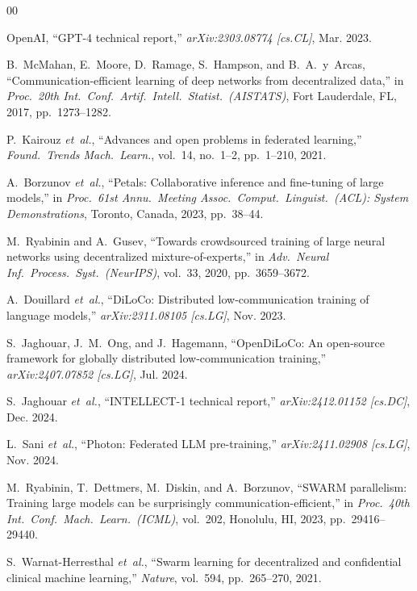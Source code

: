 \documentclass[conference]{IEEEtran}
\begin{document}
\balance
\begin{thebibliography}{00}

OpenAI, ``GPT-4 technical report,'' \emph{arXiv:2303.08774 [cs.CL]}, Mar. 2023.

B.~McMahan, E.~Moore, D.~Ramage, S.~Hampson, and B.~A.~y~Arcas, ``Communication-efficient learning of deep networks from decentralized data,'' in \emph{Proc.\ 20th Int.\ Conf.\ Artif.\ Intell.\ Statist.\ (AISTATS)}, Fort Lauderdale, FL, 2017, pp.~1273--1282.

P.~Kairouz \emph{et~al.}, ``Advances and open problems in federated learning,'' \emph{Found.\ Trends Mach.\ Learn.}, vol.~14, no.~1--2, pp.~1--210, 2021.

A.~Borzunov \emph{et~al.}, ``Petals: Collaborative inference and fine-tuning of large models,'' in \emph{Proc.\ 61st Annu.\ Meeting Assoc.\ Comput.\ Linguist.\ (ACL): System Demonstrations}, Toronto, Canada, 2023, pp.~38--44.

M.~Ryabinin and A.~Gusev, ``Towards crowdsourced training of large neural networks using decentralized mixture-of-experts,'' in \emph{Adv.\ Neural Inf.\ Process.\ Syst.\ (NeurIPS)}, vol.~33, 2020, pp.~3659--3672.

A.~Douillard \emph{et~al.}, ``DiLoCo: Distributed low-communication training of language models,'' \emph{arXiv:2311.08105 [cs.LG]}, Nov. 2023.

S.~Jaghouar, J.~M.~Ong, and J.~Hagemann, ``OpenDiLoCo: An open-source framework for globally distributed low-communication training,'' \emph{arXiv:2407.07852 [cs.LG]}, Jul. 2024.

S.~Jaghouar \emph{et~al.}, ``INTELLECT-1 technical report,'' \emph{arXiv:2412.01152 [cs.DC]}, Dec. 2024.

L.~Sani \emph{et~al.}, ``Photon: Federated LLM pre-training,'' \emph{arXiv:2411.02908 [cs.LG]}, Nov. 2024.

M.~Ryabinin, T.~Dettmers, M.~Diskin, and A.~Borzunov, ``SWARM parallelism: Training large models can be surprisingly communication-efficient,'' in \emph{Proc.\ 40th Int.\ Conf.\ Mach.\ Learn.\ (ICML)}, vol.~202, Honolulu, HI, 2023, pp.~29416--29440.

S.~Warnat-Herresthal \emph{et~al.}, ``Swarm learning for decentralized and confidential clinical machine learning,'' \emph{Nature}, vol.~594, pp.~265--270, 2021.


\end{thebibliography}
\end{document}
